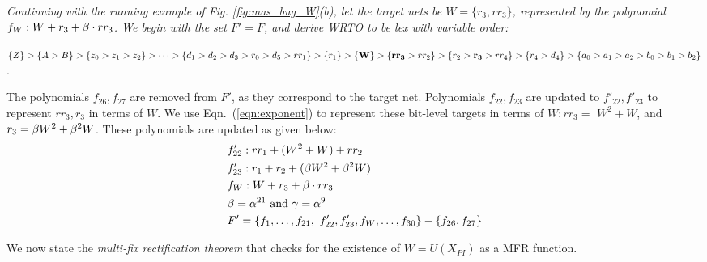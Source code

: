 \begin{Example}
  \label{ex:rect_setup}
{\it 
Continuing with the running example of Fig. \ref{fig:mas_bug_W}(b), 
let the target nets be $W = \{r_3,rr_3\}$, represented by the
polynomial $f_W:W+r_3+\beta \cdot rr_3$. We begin with the set $F'=F$,
and derive WRTO to be {\it lex} with variable order: 

$\{Z\}>\{A>B\}>\{z_0>z_1>z_2\}>\cdots>\{d_1>d_2>d_3>r_0>d_5>rr_1\}>
\{r_1\}>{\bf \{W\}}>\{{\bf rr_3}>rr_2\}>\{r_2>{\bf r_3}>rr_4\}>\{r_4>d_4\}>\{a_0>a_1>a_2>b_0>b_1>b_2\}$.

The polynomials $f_{26}, f_{27}$ are removed from $F'$, as they
correspond to the target net. Polynomials $f_{22}, f_{23}$ are 
updated to $f'_{22}, f'_{23}$ to represent $rr_3, r_3$ in terms of
$W$. We use Eqn.~(\ref{eqn:exponent}) to represent these bit-level
targets in terms of $W: rr_3=$ $ W^2+W$, and $r_3 = \beta W^2 +\beta^2
W$. These polynomials are updated as given below:
\begin{align*}
&f'_{22}:rr_1  + (W^2+W) + rr_2\\
&f'_{23}:r_1 + r_2 + (\beta W^2 +\beta^2 W)\\
&f_W:W + r_3 + \beta \cdot rr_3\\     
&\beta=\alpha^{21} \text{ and } \gamma=\alpha^9 \\
&F'=\{f_1,\dots,f_{21},~f'_{22},f'_{23},f_W,\dots,f_{30}\}-\{f_{26},f_{27}\}
\end{align*}
}
\end{Example}
We now state the {\it multi-fix rectification theorem} that checks
for the existence of $W = U(X_{PI})$ as a MFR function.

